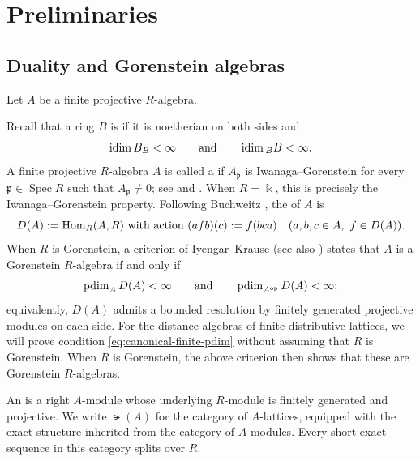 \documentclass[a4paper,leqno]{amsart}
\begin{document}

\section{Preliminaries}
\label{sec:preliminaries}



\subsection{Duality and Gorenstein algebras}
\label{subsec:duality-gorenstein}

Let $A$ be a finite projective $R$-algebra.

Recall that a ring $B$ is  if it is noetherian on both sides and
\[
 \operatorname{idim} B_B<\infty
 \qquad\text{and}\qquad
 \operatorname{idim} {}_B B<\infty.
\]
A finite projective $R$-algebra $A$ is called a  if $A_{\mathfrak p}$ is Iwanaga--Gorenstein for every $\mathfrak p\in\operatorname{Spec}R$ such that $A_{\mathfrak p}\neq0$; see \cite[Definition~1.1]{IK22} and \cite[Definition~6.1]{GIK23}. When $R=\Bbbk$, this is precisely the Iwanaga--Gorenstein property.
Following Buchweitz \cite[Section~7.6]{Buc21}, the  of $A$ is
\[
 D(A):=\operatorname{Hom}_R(A,R) \text{ with action } (a f b)(c):=f(bca)
 \quad(a,b,c\in A,\ f\in D(A)).
\]
When $R$ is Gorenstein, a criterion of Iyengar--Krause \cite[Theorem~4.6]{IK22} (see also \cite[Theorem~6.7]{GIK23}) states that $A$ is a Gorenstein $R$-algebra if and only if
\begin{equation}
 \operatorname{pdim}_A D(A)<\infty
 \qquad\text{and}\qquad
 \operatorname{pdim}_{A^{\operatorname{op}}}D(A)<\infty;
 \label{eq:canonical-finite-pdim}
\end{equation}
equivalently, $D(A)$ admits a bounded resolution by finitely generated projective modules on each side.  For the distance algebras of finite distributive lattices, we will prove condition \eqref{eq:canonical-finite-pdim} without assuming that $R$ is Gorenstein.  When $R$ is Gorenstein, the above criterion then shows that these are Gorenstein $R$-algebras.

An  is a right $A$-module whose underlying $R$-module is finitely generated and projective. We write $\lat(A)$ for the category of $A$-lattices, equipped with the exact structure inherited from the category of $A$-modules. Every short exact sequence in this category splits over $R$.
\end{document}
